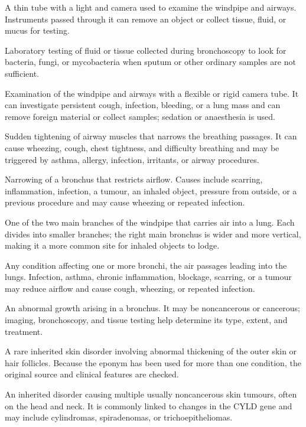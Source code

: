  A thin tube with a light and camera used to examine the windpipe and airways. Instruments passed through it can remove an object or collect tissue, fluid, or mucus for testing.

 Laboratory testing of fluid or tissue collected during bronchoscopy to look for bacteria, fungi, or mycobacteria when sputum or other ordinary samples are not sufficient.

 Examination of the windpipe and airways with a flexible or rigid camera tube. It can investigate persistent cough, infection, bleeding, or a lung mass and can remove foreign material or collect samples; sedation or anaesthesia is used.

 Sudden tightening of airway muscles that narrows the breathing passages. It can cause wheezing, cough, chest tightness, and difficulty breathing and may be triggered by asthma, allergy, infection, irritants, or airway procedures.

 Narrowing of a bronchus that restricts airflow. Causes include scarring, inflammation, infection, a tumour, an inhaled object, pressure from outside, or a previous procedure and may cause wheezing or repeated infection.

 One of the two main branches of the windpipe that carries air into a lung. Each divides into smaller branches; the right main bronchus is wider and more vertical, making it a more common site for inhaled objects to lodge.

 Any condition affecting one or more bronchi, the air passages leading into the lungs. Infection, asthma, chronic inflammation, blockage, scarring, or a tumour may reduce airflow and cause cough, wheezing, or repeated infection.

 An abnormal growth arising in a bronchus. It may be noncancerous or cancerous; imaging, bronchoscopy, and tissue testing help determine its type, extent, and treatment.

 A rare inherited skin disorder involving abnormal thickening of the outer skin or hair follicles. Because the eponym has been used for more than one condition, the original source and clinical features are checked.

 An inherited disorder causing multiple usually noncancerous skin tumours, often on the head and neck. It is commonly linked to changes in the CYLD gene and may include cylindromas, spiradenomas, or trichoepitheliomas.

